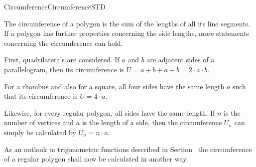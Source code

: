 \begin{MXContent}{Circumference}{Circumference}{STD}

The circumference of a polygon is the sum of the lengths of all its
line segments. If a polygon has further properties concerning the side lengths, 
more statements concerning the circumference can hold.

First, quadrilaterals are considered. If $a$ and $b$ are adjacent sides 
of a parallelogram, then its circumference is 
$U = a + b + a + b = 2 \cdot a \cdot b$.

For a rhombus and also for a square, all four sides have the same length $a$ such
that its circumference is $U = 4 \cdot a$.

Likewise, for every regular polygon, all sides have the same length. If $n$ is the number 
of vertices and $a$ is the length of a side, then the circumference $U_n$ can simply be
calculated by $U_n = n \cdot a$.

As an outlook to trigonometric functions described in Section~ 
the circumference of a regular polygon shall now be calculated in another way. 


\begin{center}
\end{center}


\end{MXContent}

